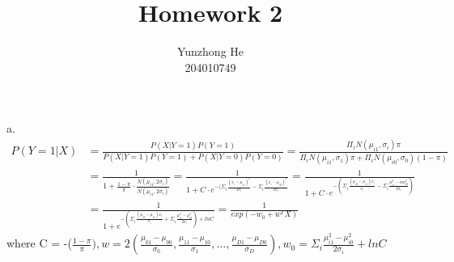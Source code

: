 \documentclass[12pt]{article}
\newenvironment{problem}[2][Problem]{\begin{trivlist}
\item[\hskip \labelsep {\bfseries #1}\hskip \labelsep {\bfseries #2}]}{\end{trivlist}}
\begin{document}
 
 
\title{Homework 2}%
\author{Yunzhong He\\ %
204010749} %
 
\maketitle
 
\begin{problem}{1. Naive Bayers}
\item{a.}
\begin{align*}
  P(Y=1|X) &= \frac{P(X|Y=1)P(Y=1)}{P(X|Y=1)P(Y=1) + P(X|Y=0)P(Y=0)}
            = \frac{\Pi_i N(\mu_{i1}, \sigma_i)\pi}{\Pi_i N(\mu_{i1}, \sigma_1)\pi + \Pi_i N(\mu_{i0}, \sigma_0)(1-\pi)} \\
			&= \frac{1}{1+\frac{1-\pi}{\pi} \cdot \frac{N(\mu_{i1}, 2\sigma_i)}{N(\mu_{i1}, 2\sigma_i)}}
		    = \frac{1}{1+C \cdot e^{-(\Sigma_i \frac{(x_i-\mu_{i1})^2}{2\sigma_i} - \Sigma_i \frac{(x_i-\mu_{i0})^2}{2\sigma_i}}} 
		    = \frac{1}{1+C \cdot e^{-(\Sigma_i \frac{(\mu_{i0}-\mu_{i1})x_i}{\sigma_i} - \Sigma_i \frac{\mu_{i1}^2 - mu_{i0}^2}{2\sigma_i}) }} \\ 
			&= \frac{1}{1+e^{-(\Sigma_i \frac{(\mu_{i0}-\mu_{i1})x_i}{\sigma_i} + \Sigma_i \frac{\mu_{i1}^2 - \mu_{i0}^2}{2\sigma_i}) + lnC }} = \frac{1}{exp(-w_0 + w^T X)}
\end{align*}
where C = -($\frac{1-\pi}{\pi}), w = 2(\frac{\mu_{01}-\mu_{00}}{\sigma_0}, \frac{\mu_{11}-\mu_{10}}{\sigma_1}, \dots, \frac{\mu_{D1}-\mu_{D0}}{\sigma_D}), 
w_0 = \Sigma_i \frac{\mu_{i1}^2-\mu_{i0}^2}{2\sigma_i} + lnC$


\end{problem}
\end{document}
